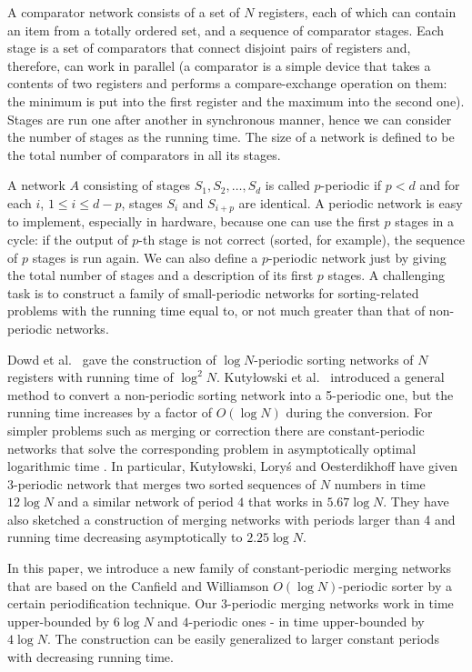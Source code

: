 \documentclass{llncs}
\begin{document}
A comparator network consists of a set of $N$ registers, each of which can
contain an item from a totally ordered set, and a sequence of
comparator stages.  Each stage is a set of comparators that connect
disjoint pairs of registers and, therefore, can work in parallel (a
comparator is a simple device that takes a contents of two registers
and performs a compare-exchange operation on them: the minimum is put
into the first register and the maximum into the second one). Stages
are run one after another in synchronous manner, hence we can consider
the number of stages as the running time. The size of a network is 
defined to be the total number of comparators in all its stages.

A network $A$ consisting of stages $S_1,S_2,\ldots,S_d$ is called $p$-periodic
if $p<d$ and for each $i$, $1\le i\le d-p$, stages $S_i$ and $S_{i+p}$ are
identical.  A periodic network is easy to implement, especially in hardware,
because one can use the first $p$ stages in a cycle: if the output of $p$-th
stage is not correct (sorted, for example), the sequence of $p$ stages is run
again. We can also define a $p$-periodic network just by giving the total
number of stages and a description of its first $p$ stages. A challenging task
is to construct a family of small-periodic networks for sorting-related
problems with the running time equal to, or not much greater than that of
non-periodic networks.

Dowd et al.\ \cite{dpsr} gave the construction of $\log N$-periodic sorting
networks of $N$ registers with running time of $\log^2 N$.  Kuty{\l}owski et
al.\ \cite{klow} introduced a general method to convert a non-periodic sorting
network into a 5-periodic one, but the running time increases by a factor of
$O(\log N)$ during the conversion. For simpler problems such as merging or
correction there are constant-periodic networks that solve the corresponding
problem in asymptotically optimal logarithmic time \cite{klo,p}. In
particular, Kuty{\l}owski, Lory{\'s} and Oesterdikhoff \cite{klo} have given
$3$-periodic network that merges two sorted sequences of $N$ numbers in time
$12\log N$ and a similar network of period $4$ that works in $5.67\log N$.
They have also sketched a construction of merging networks with periods larger
than 4 and running time decreasing asymptotically to $2.25\log N$.

In this paper, we introduce a new family of constant-periodic merging
networks that are based on the Canfield and Williamson $O(\log
N)$-periodic sorter \cite{cw} by a certain periodification technique.
Our $3$-periodic merging networks work in time upper-bounded by $6\log
N$ and $4$-periodic ones - in time upper-bounded by $4\log N$. The
construction can be easily generalized to larger constant periods with
decreasing running time.
\end{document}
